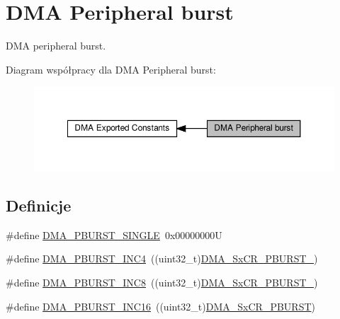 \hypertarget{group___d_m_a___peripheral__burst}{}\section{D\+MA Peripheral burst}
\label{group___d_m_a___peripheral__burst}


D\+MA peripheral burst.  


Diagram współpracy dla D\+MA Peripheral burst\+:\nopagebreak
\begin{figure}[H]
\begin{center}
\leavevmode
\includegraphics[width=350pt]{group___d_m_a___peripheral__burst}
\end{center}
\end{figure}
\subsection*{Definicje}
\begin{DoxyCompactItemize}
\item 
\#define \hyperlink{group___d_m_a___peripheral__burst_ga1ee9cf4dc1c8bfc5ab6dfb95a00f81ff}{D\+M\+A\+\_\+\+P\+B\+U\+R\+S\+T\+\_\+\+S\+I\+N\+G\+LE}~0x00000000U
\item 
\#define \hyperlink{group___d_m_a___peripheral__burst_gacc54efc746528ed9e0173dad956f7caf}{D\+M\+A\+\_\+\+P\+B\+U\+R\+S\+T\+\_\+\+I\+N\+C4}~((uint32\+\_\+t)\hyperlink{group___peripheral___registers___bits___definition_gadf0eee1ad1788868a194f95107057a16}{D\+M\+A\+\_\+\+Sx\+C\+R\+\_\+\+P\+B\+U\+R\+S\+T\+\_})
\item 
\#define \hyperlink{group___d_m_a___peripheral__burst_gaf76dd9b208c8606e8c5ae7abf8c26532}{D\+M\+A\+\_\+\+P\+B\+U\+R\+S\+T\+\_\+\+I\+N\+C8}~((uint32\+\_\+t)\hyperlink{group___peripheral___registers___bits___definition_ga061207b2c654a0dd62e40187c9557eda}{D\+M\+A\+\_\+\+Sx\+C\+R\+\_\+\+P\+B\+U\+R\+S\+T\+\_})
\item 
\#define \hyperlink{group___d_m_a___peripheral__burst_ga705a631ea96b34aa5afa7fed06a487e0}{D\+M\+A\+\_\+\+P\+B\+U\+R\+S\+T\+\_\+\+I\+N\+C16}~((uint32\+\_\+t)\hyperlink{group___peripheral___registers___bits___definition_ga502380abb155eb3b37a2ca9359e2da2e}{D\+M\+A\+\_\+\+Sx\+C\+R\+\_\+\+P\+B\+U\+R\+ST})
\end{DoxyCompactItemize}


